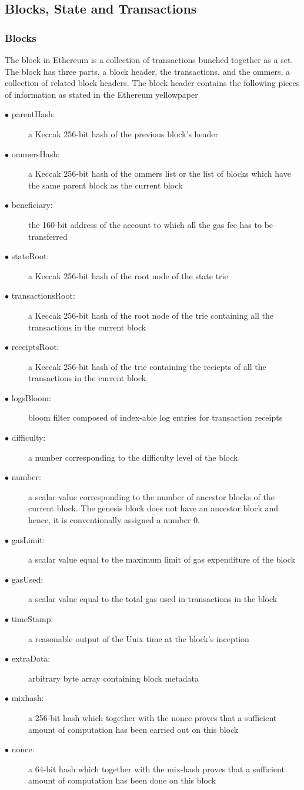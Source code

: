 \documentclass[a4paper,twoside,phd]{BYUPhys}
\begin{document}
\subsection{Blocks, State and Transactions}
\subsubsection{Blocks}
The block in Ethereum is a collection of transactions bunched together as a set\cite{ButerinAPLATFORM}. The block has three parts, a block header, the transactions, and the ommers, a collection of related block headers\cite{Wood2018ETHEREUM:LEDGER}. The block header contains the following pieces of information as stated in the Ethereum yellowpaper\cite{Wood2018ETHEREUM:LEDGER}
\begin{description}
\item[$\bullet$ parentHash:] a Keccak 256-bit hash of the previous block's header
\item[$\bullet$ ommersHash:] a Keccak 256-bit hash of the ommers list or the list of blocks which have the same parent block as the current block
\item[$\bullet$ beneficiary:] the 160-bit address of the account to which all the gas fee has to be transferred
\item[$\bullet$ stateRoot:] a Keccak 256-bit hash of the root node of the state trie
\item[$\bullet$ transactionsRoot:] a Keccak 256-bit hash of the root node of the trie containing all the transactions in the current block
\item[$\bullet$ receiptsRoot:] a Keccak 256-bit hash of the trie containing the reciepts of all the transactions in the current block
\item[$\bullet$ logsBloom:] bloom filter composed of index-able log entries for transaction receipts
\item[$\bullet$ difficulty:] a number corresponding to the difficulty level of the block
\item[$\bullet$ number:] a scalar value corresponding to the number of ancestor blocks of the current block. The genesis block does not have an ancestor block and hence, it is conventionally assigned a number 0.
\item[$\bullet$ gasLimit:] a scalar value equal to the maximum limit of gas expenditure of the block
\item[$\bullet$ gasUsed:] a scalar value equal to the total gas used in transactions in the block
\item[$\bullet$ timeStamp:] a reasonable output of the Unix time at the block's inception
\item[$\bullet$ extraData:] arbitrary byte array containing block metadata
\item[$\bullet$ mixhash:] a 256-bit hash which together with the nonce proves that a sufficient amount of computation has been carried out on this block
\item[$\bullet$ nonce:] a 64-bit hash which together with the mix-hash proves that a sufficient amount of computation has been done on this block
\end{description}
\end{document}
